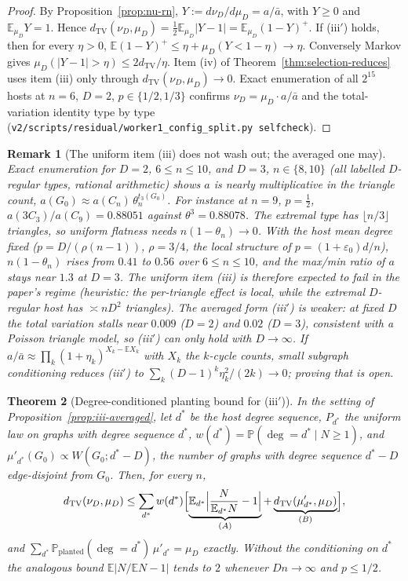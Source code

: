 \documentclass[11pt]{article}
\newtheorem{theorem}{Theorem}
\newtheorem{remark}[theorem]{Remark}
\newcommand{\EE}{\mathbb{E}}
\newcommand{\PP}{\mathbb{P}}
\newcommand{\dTV}{d_{\mathrm{TV}}}
\begin{document}
\begin{proof}
By Proposition~\ref{prop:nu-rn}, \(Y:=d\nu_D/d\mu_D=a/\bar a\), with \(Y\ge0\) and
\(\EE_{\mu_D}Y=1\). Hence \(\dTV(\nu_D,\mu_D)=\tfrac12\EE_{\mu_D}\lvert Y-1\rvert
=\EE_{\mu_D}(1-Y)^+\). If (iii\('\)) holds, then for every \(\eta>0\),
\(\EE(1-Y)^+\le\eta+\mu_D(Y<1-\eta)\to\eta\). Conversely Markov gives
\(\mu_D(\lvert Y-1\rvert>\eta)\le 2\dTV/\eta\). Item (iv) of
Theorem~\ref{thm:selection-reduces} uses item (iii) only through
\(\dTV(\nu_D,\mu_D)\to0\). Exact enumeration of all \(2^{15}\) hosts at
\(n=6\), \(D=2\), \(p\in\{1/2,1/3\}\) confirms \(\nu_D=\mu_D\cdot a/\bar a\) and the
total-variation identity type by type
(\texttt{v2/scripts/residual/worker1\_config\_split.py selfcheck}).
\end{proof}

\begin{remark}[The uniform item (iii) does not wash out; the averaged one may]
\label{rem:iii-uniform-vs-averaged}
Exact enumeration for \(D=2\), \(6\le n\le10\), and \(D=3\), \(n\in\{8,10\}\)
(all labelled \(D\)-regular types, rational arithmetic) shows \(a\) is nearly
multiplicative in the triangle count, \(a(G_0)\approx a(C_n)\,\theta_n^{t_3(G_0)}\).
For instance at \(n=9\), \(p=\tfrac12\), \(a(3C_3)/a(C_9)=0.88051\) against
\(\theta^3=0.88078\). The extremal type has \(\lfloor n/3\rfloor\) triangles, so
uniform flatness needs \(n(1-\theta_n)\to0\). With the host mean degree fixed
(\(p=D/(\rho(n-1))\), \(\rho=3/4\), the local structure of
\(p=(1+\varepsilon_0)d/n\)), \(n(1-\theta_n)\) rises from \(0.41\) to \(0.56\) over
\(6\le n\le10\), and the max/min ratio of \(a\) stays near \(1.3\) at \(D=3\).
The uniform item (iii) is therefore expected to fail in the paper's regime
(heuristic: the per-triangle effect is local, while the extremal \(D\)-regular
host has \(\asymp nD^2\) triangles). The averaged form
(iii\('\)) is weaker: at fixed \(D\) the total variation stalls near \(0.009\)
(\(D=2\)) and \(0.02\) (\(D=3\)), consistent with a Poisson triangle model, so
(iii\('\)) can only hold with \(D\to\infty\). If
\(a/\bar a\approx\prod_k(1+\eta_k)^{X_k-\EE X_k}\) with \(X_k\) the \(k\)-cycle
counts, small subgraph conditioning reduces (iii\('\)) to
\(\sum_k(D-1)^k\eta_k^2/(2k)\to0\); proving that is open.
\end{remark}

\begin{theorem}[Degree-conditioned planting bound for (iii\('\))]
\label{thm:tv-planting}
In the setting of Proposition~\ref{prop:iii-averaged}, let \(d^*\) be the host
degree sequence, \(P_{d^*}\) the uniform law on graphs with degree sequence
\(d^*\), \(w(d^*)=\PP(\deg=d^*\mid N\ge1)\), and
\(\mu'_{d^*}(G_0)\propto W(G_0;d^*-D)\), the number of graphs with degree sequence
\(d^*-D\) edge-disjoint from \(G_0\). Then, for every \(n\),
\[
\dTV(\nu_D,\mu_D)\le\sum_{d^*}w(d^*)\Bigl[\underbrace{\EE_{d^*}\Bigl\lvert
\frac{N}{\EE_{d^*}N}-1\Bigr\rvert}_{(A)}+\underbrace{\dTV(\mu'_{d^*},\mu_D)}_{(B)}\Bigr],
\]
and \(\sum_{d^*}\PP_{\mathrm{planted}}(\deg=d^*)\,\mu'_{d^*}=\mu_D\) exactly. Without
the conditioning on \(d^*\) the analogous bound \(\EE\lvert N/\EE N-1\rvert\) tends
to \(2\) whenever \(Dn\to\infty\) and \(p\le1/2\).
\end{theorem}
\end{document}
